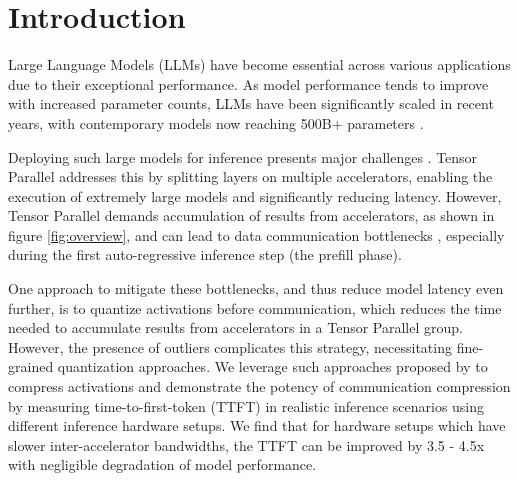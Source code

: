 
\chapter{Introduction}\label{chapter:introduction}
Large Language Models (LLMs) have become essential across various applications due to their exceptional performance. As model performance tends to improve with increased parameter counts, LLMs have been significantly scaled in recent years, with contemporary models now reaching 500B+ parameters \parencite{palm}.

Deploying such large models for inference presents major challenges \parencite{efficientlyscaling}. Tensor Parallel \parencite{megatron} addresses this by splitting layers on multiple accelerators, enabling the execution of extremely large models and significantly reducing latency. However, Tensor Parallel demands accumulation of results from accelerators, as shown in figure \ref{fig:overview}, and can lead to data communication bottlenecks \parencite{optimizingcommunication, mnemosyne}, especially during the first auto-regressive inference step (the prefill phase).

One approach to mitigate these bottlenecks, and thus reduce model latency even further, is to quantize activations before communication, which reduces the time needed to accumulate results from accelerators in a Tensor Parallel group. However, the presence of outliers \parencite{llmint8, awq} complicates this strategy, necessitating fine-grained quantization approaches. We leverage such approaches proposed by \cite{microscaling} to compress activations and demonstrate the potency of communication compression by measuring time-to-first-token (TTFT) in realistic inference scenarios using different inference hardware setups. We find that for hardware setups which have slower inter-accelerator bandwidths, the TTFT can be improved by 3.5 - 4.5x with negligible degradation of model performance.
